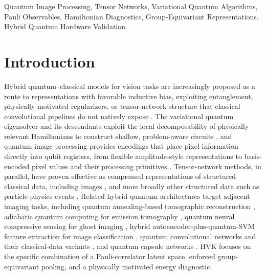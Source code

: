 \documentclass[journal]{IEEEtran}
\begin{document}
\begin{IEEEkeywords}
Quantum Image Processing, Tensor Networks, Variational Quantum Algorithms, Pauli Observables, Hamiltonian Diagnostics, Group-Equivariant Representations, Hybrid Quantum Hardware Validation.
\end{IEEEkeywords}

\section{Introduction}
Hybrid quantum--classical models for vision tasks are increasingly proposed as a route to representations with favorable inductive bias, exploiting entanglement, physically motivated regularizers, or tensor-network structure that classical convolutional pipelines do not natively expose \cite{Cerezo2021, Tilly2022, Preskill2018}. The variational quantum eigensolver and its descendants exploit the local decomposability of physically relevant Hamiltonians to construct shallow, problem-aware circuits \cite{Cerezo2021, Tilly2022, Bauer2020}, and quantum image processing provides encodings that place pixel information directly into qubit registers, from flexible amplitude-style representations \cite{Le2011} to basis-encoded pixel values \cite{Zhang2013} and their processing primitives \cite{Chakraborty2018, Zhou2017, Yao2017}. Tensor-network methods, in parallel, have proven effective as compressed representations of structured classical data, including images \cite{Cirac2021, Latorre2005, Han2018, Stoudenmire2016, Fei2021, Guala2023}, and more broadly other structured data such as particle-physics events \cite{Araz2022}. Related hybrid quantum architectures target adjacent imaging tasks, including quantum annealing-based tomographic reconstruction \cite{Haga2024}, adiabatic quantum computing for emission tomography \cite{Nau2023}, quantum neural compressive sensing for ghost imaging \cite{Zhai2025}, hybrid autoencoder-plus-quantum-SVM feature extraction for image classification \cite{Slabbert2024}, quantum convolutional networks and their classical-data variants \cite{Cong2019, Hur2022}, and quantum capsule networks \cite{Liu2022}. HVK focuses on the specific combination of a Pauli-correlator latent space, enforced group-equivariant pooling, and a physically motivated energy diagnostic.
\end{document}
